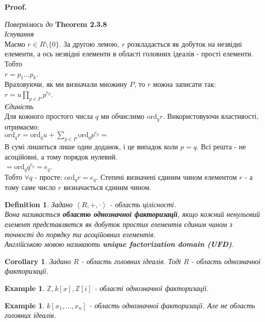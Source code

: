 \documentclass[a4paper, 14pt]{extarticle}
\makeatletter
\theoremstyle{theoremdd}
\theoremstyle{theoremdd}
\newtheorem{definition}[theorem]{Definition}
\theoremstyle{theoremdd}
\theoremstyle{theoremdd}
\newtheorem{example}[theorem]{Example}
\theoremstyle{theoremdd}
\theoremstyle{theoremdd}
\theoremstyle{theoremdd}
\theoremstyle{theoremdd}
\newtheorem{corollary}[theorem]{Corollary}
\def\qed{$\blacksquare$}
\renewenvironment{proof}[1][Proof.\\]{\par
\pushQED{\hfill \qed}%
\normalfont \topsep6\p@\@plus6\p@\relax
\trivlist
\item\relax
{\bfseries
#1\@addpunct{.}}\hspace\labelsep\ignorespaces
}{%
\popQED\endtrivlist\@endpefalse
}
\makeatother
\begin{document}
\begin{proof}
\textit{Повернімось до} \textbf{Theorem 2.3.8}\\
\textit{Існування}\\
Маємо $r \in R \setminus \{0\}$. За другою лемою, $r$ розкладається як добуток на незвідні елементи, а ось незвідні елементи в області головних ідеалів - прості елементи. Тобто\\
$r = p_1 \dots p_k$.\\
Враховуючи, як ми визначали множину $P$, то $r$ можна записати так:\\
$r = u \displaystyle\prod_{p \in P} p^{e_p}$.
\bigskip \\
\textit{Єдиність}\\
Для кожного простого числа $q$ ми обчислимо $\text{ord}_q r$. Використовуючи властивості, отримаємо:\\
$\text{ord}_q r = \text{ord}_q u + \displaystyle\sum_{p \in P} \text{ord}_q p^{e_p} \boxed{=}$\\
В сумі лишиться лише один доданок, і це випадок коли $p = q$. Всі решта - не асоційовні, а тому порядок нулевий.\\
$\boxed{=} \text{ord}_q q^{e_q} = e_q$.\\
Тобто $\forall q$ - просте: $\text{ord}_q r = e_q$. Степені визначені єдиним чином елементом $r$ - а тому саме число $r$ визначається єдиним чином. 
\end{proof}


\begin{definition}
Задано $\left<R,+,\cdot \right>$ - область цілісності.\\
Вона називається \textbf{областю однозначної факторизації}, якщо кожний ненульовий елемент представляется як добуток простих елементів єдиним чином з точності до порядку та асоційовних елементів.\\
Англійською мовою називають \textbf{unique factorization domain (UFD)}.
\end{definition}

\begin{corollary}
Задано $R$ - область головних ідеалів. Тоді $R$ - область однозначної факторизації.
\end{corollary}

\begin{example}
$\mathbb{Z}, k[x], \mathbb{Z}[i]$ - області однозначної факторизації.
\end{example}

\begin{example}
$k[x_1,\dots,x_n]$ - область однозначної факторизації. Але не область головних ідеалів.
\end{example}
\newpage
\end{document}
